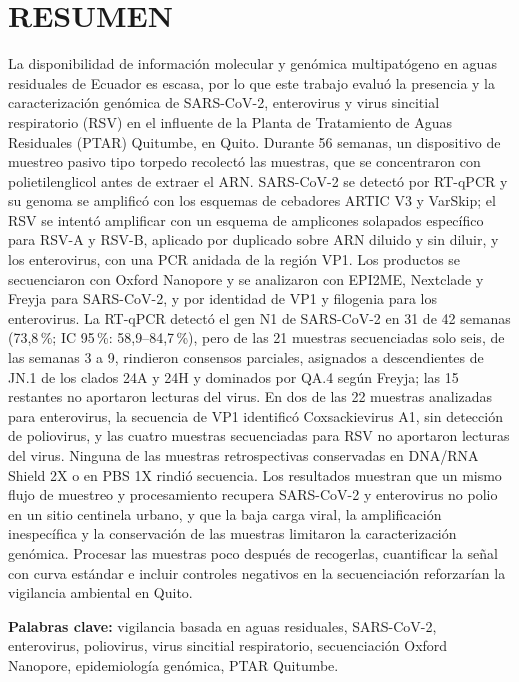 \section{RESUMEN}

La disponibilidad de información molecular y genómica multipatógeno en aguas residuales de Ecuador es escasa, por lo que este trabajo evaluó la presencia y la caracterización genómica de SARS-CoV-2, enterovirus y virus sincitial respiratorio (RSV) en el influente de la Planta de Tratamiento de Aguas Residuales (PTAR) Quitumbe, en Quito. Durante 56 semanas, un dispositivo de muestreo pasivo tipo torpedo recolectó las muestras, que se concentraron con polietilenglicol antes de extraer el ARN. SARS-CoV-2 se detectó por RT-qPCR y su genoma se amplificó con los esquemas de cebadores ARTIC V3 y VarSkip; el RSV se intentó amplificar con un esquema de amplicones solapados específico para RSV-A y RSV-B, aplicado por duplicado sobre ARN diluido y sin diluir, y los enterovirus, con una PCR anidada de la región VP1. Los productos se secuenciaron con Oxford Nanopore y se analizaron con EPI2ME, Nextclade y Freyja para SARS-CoV-2, y por identidad de VP1 y filogenia para los enterovirus. La RT-qPCR detectó el gen N1 de SARS-CoV-2 en 31 de 42 semanas (73,8\,\%; IC 95\,\%: 58,9--84,7\,\%), pero de las 21 muestras secuenciadas solo seis, de las semanas 3 a 9, rindieron consensos parciales, asignados a descendientes de JN.1 de los clados 24A y 24H y dominados por QA.4 según Freyja; las 15 restantes no aportaron lecturas del virus. En dos de las 22 muestras analizadas para enterovirus, la secuencia de VP1 identificó Coxsackievirus A1, sin detección de poliovirus, y las cuatro muestras secuenciadas para RSV no aportaron lecturas del virus. Ninguna de las muestras retrospectivas conservadas en DNA/RNA Shield 2X o en PBS 1X rindió secuencia. Los resultados muestran que un mismo flujo de muestreo y procesamiento recupera SARS-CoV-2 y enterovirus no polio en un sitio centinela urbano, y que la baja carga viral, la amplificación inespecífica y la conservación de las muestras limitaron la caracterización genómica. Procesar las muestras poco después de recogerlas, cuantificar la señal con curva estándar e incluir controles negativos en la secuenciación reforzarían la vigilancia ambiental en Quito.

\vspace{0.5\baselineskip}

\noindent\textbf{Palabras clave:} vigilancia basada en aguas residuales, SARS-CoV-2, enterovirus, poliovirus, virus sincitial respiratorio, secuenciación Oxford Nanopore, epidemiología genómica, PTAR Quitumbe.
